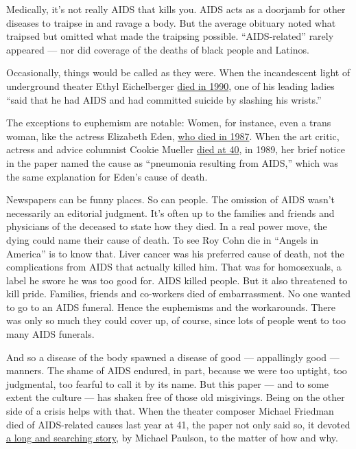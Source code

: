 Medically, it's not really AIDS that kills you. AIDS acts as a doorjamb
for other diseases to traipse in and ravage a body. But the average
obituary noted what traipsed but omitted what made the traipsing
possible. ``AIDS-related'' rarely appeared --- nor did coverage of the
deaths of black people and Latinos.

Occasionally, things would be called as they were. When the incandescent
light of underground theater Ethyl Eichelberger
\href{https://www.nytimes3xbfgragh.onion/1990/08/14/obituaries/ethyl-eichelberger-performer-45-creator-of-a-gallery-of-characters.html}{died
in 1990}, one of his leading ladies ``said that he had AIDS and had
committed suicide by slashing his wrists.''

The exceptions to euphemism are notable: Women, for instance, even a
trans woman, like the actress Elizabeth Eden,
\href{https://www.nytimes3xbfgragh.onion/1987/10/01/obituaries/elizabeth-eden-transsexual-who-figured-in-1975-movie.html}{who
died in 1987}. When the art critic, actress and advice columnist Cookie
Mueller
\href{https://www.nytimes3xbfgragh.onion/1989/11/15/obituaries/cookie-mueller-dead-actress-and-writer-40.html}{died
at 40}, in 1989, her brief notice in the paper named the cause as
``pneumonia resulting from AIDS,'' which was the same explanation for
Eden's cause of death.

Newspapers can be funny places. So can people. The omission of AIDS
wasn't necessarily an editorial judgment. It's often up to the families
and friends and physicians of the deceased to state how they died. In a
real power move, the dying could name their cause of death. To see Roy
Cohn die in ``Angels in America'' is to know that. Liver cancer was his
preferred cause of death, not the complications from AIDS that actually
killed him. That was for homosexuals, a label he swore he was too good
for. AIDS killed people. But it also threatened to kill pride. Families,
friends and co-workers died of embarrassment. No one wanted to go to an
AIDS funeral. Hence the euphemisms and the workarounds. There was only
so much they could cover up, of course, since lots of people went to too
many AIDS funerals.

And so a disease of the body spawned a disease of good --- appallingly
good --- manners. The shame of AIDS endured, in part, because we were
too uptight, too judgmental, too fearful to call it by its name. But
this paper --- and to some extent the culture --- has shaken free of
those old misgivings. Being on the other side of a crisis helps with
that. When the theater composer Michael Friedman died of AIDS-related
causes last year at 41, the paper not only said so, it devoted
\href{https://www.nytimes3xbfgragh.onion/2017/10/11/theater/michael-friedman-aids-death-theater.html}{a
long and searching story}, by Michael Paulson, to the matter of how and
why.


